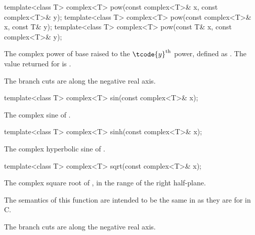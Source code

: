 %
\begin{itemdecl}
template<class T> complex<T> pow(const complex<T>& x, const complex<T>& y);
template<class T> complex<T> pow(const complex<T>& x, const T& y);
template<class T> complex<T> pow(const T& x, const complex<T>& y);
\end{itemdecl}

\begin{itemdescr}
\pnum
\returns
The complex power of base  raised to the $\tcode{y}^\text{th}$ power,
defined as
.
The value returned for
is .

\pnum
\remarks
The branch cuts are along the negative real axis.
\end{itemdescr}

%
\begin{itemdecl}
template<class T> complex<T> sin(const complex<T>& x);
\end{itemdecl}

\begin{itemdescr}
\pnum
\returns
The complex sine of .
\end{itemdescr}

%
\begin{itemdecl}
template<class T> complex<T> sinh(const complex<T>& x);
\end{itemdecl}

\begin{itemdescr}
\pnum
\returns
The complex hyperbolic sine of .
\end{itemdescr}

%
\begin{itemdecl}
template<class T> complex<T> sqrt(const complex<T>& x);
\end{itemdecl}

\begin{itemdescr}
\pnum
\returns
The complex square root of , in the range of the right
half-plane.
\begin{note}
The semantics of this function are intended to be the same in \Cpp{}
as they are for  in C.
\end{note}

\pnum
\remarks
The branch cuts are along the negative real axis.
\end{itemdescr}

